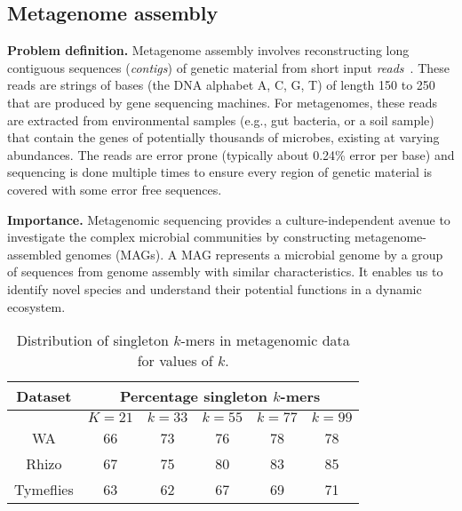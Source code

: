 \subsection{Metagenome assembly}


{\bf Problem definition.}
Metagenome assembly involves reconstructing long contiguous sequences ({\it contigs}) of genetic material from short input {\it reads}~\cite{yang2021review}. These reads are strings of bases (the DNA alphabet A, C, G, T) of length 150 to 250 that are produced by gene sequencing machines. 
For metagenomes, these reads are extracted from environmental samples (e.g., gut bacteria, or a soil sample) that contain the genes of potentially thousands of microbes, existing at varying abundances. 
The reads are error prone (typically about 0.24\% error per base) and sequencing is done multiple times to ensure every region of genetic material is covered with some error free sequences.

\noindent
{\bf Importance.}
Metagenomic sequencing provides a culture-independent avenue to investigate the complex microbial communities by constructing metagenome-assembled genomes (MAGs). A MAG represents a microbial genome by a group of sequences from genome assembly with similar characteristics. It enables us to identify novel species and understand their potential functions in a dynamic ecosystem.

\begin{wraptable}{r}{4.5in}
\centering
    \begin{tabular}{c | c | c | c | c | c}
    \toprule
    \textbf{Dataset} & \multicolumn{5}{c}{\textbf{Percentage singleton $k$-mers}} \\
    \midrule
    & $K=21$ & $k=33$ & $k=55$ & $k=77$ & $k=99$ \\
    \midrule
    WA &  66 & 73 & 76 & 78 & 78  \\
    Rhizo &  67 & 75 & 80 & 83 & 85  \\
    Tymeflies & 63 & 62 & 67 & 69 & 71 \\
    \bottomrule
    \end{tabular}
    \caption{Distribution of singleton $k$-mers in metagenomic data for values of $k$.}
    \label{tab:kmer-dist}
\end{wraptable}

